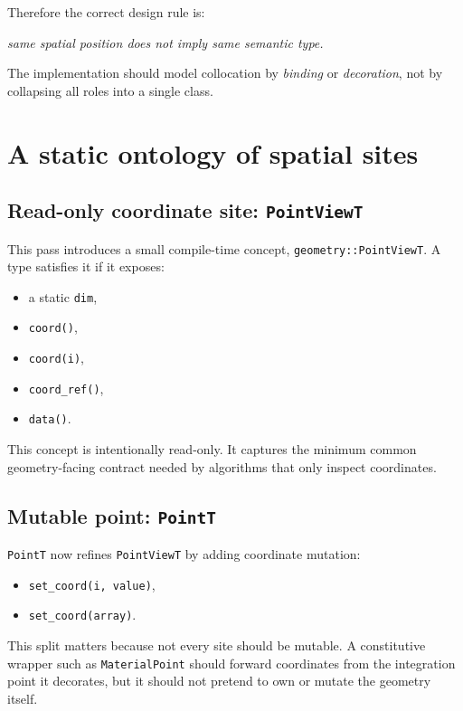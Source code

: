 Therefore the correct design rule is:
\begin{center}
\emph{same spatial position does not imply same semantic type.}
\end{center}

The implementation should model collocation by \emph{binding} or
\emph{decoration}, not by collapsing all roles into a single class.

\section{A static ontology of spatial sites}

\subsection{Read-only coordinate site: \texttt{PointViewT}}

This pass introduces a small compile-time concept,
\texttt{geometry::PointViewT}.  A type satisfies it if it exposes:
\begin{itemize}[nosep]
  \item a static \texttt{dim},
  \item \texttt{coord()},
  \item \texttt{coord(i)},
  \item \texttt{coord\_ref()},
  \item \texttt{data()}.
\end{itemize}

This concept is intentionally read-only.  It captures the minimum common
geometry-facing contract needed by algorithms that only inspect coordinates.

\subsection{Mutable point: \texttt{PointT}}

\texttt{PointT} now refines \texttt{PointViewT} by adding coordinate mutation:
\begin{itemize}[nosep]
  \item \texttt{set\_coord(i, value)},
  \item \texttt{set\_coord(array)}.
\end{itemize}

This split matters because not every site should be mutable.  A constitutive
wrapper such as \texttt{MaterialPoint} should forward coordinates from the
integration point it decorates, but it should not pretend to own or mutate the
geometry itself.

